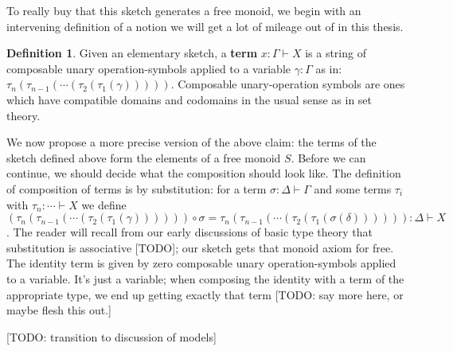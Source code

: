 \documentclass[12pt,twoside]{reedthesis}
\theoremstyle{definition}
\newtheorem{definition}{Definition}
\theoremstyle{remark}
\theoremstyle{plain}
\begin{document}
To really buy that this sketch generates a free monoid, we begin with an
intervening definition of a notion we will get a lot of mileage out of in this
thesis.
\begin{definition}\label{def:term}
  Given an elementary sketch, a \textbf{term} $x : \Gamma \vdash X$ is a string of
  composable unary operation-symbols applied to a variable $\gamma : \Gamma$ as in:
  \( \tau_{n} (\tau_{n-1} (\cdots (\tau_{2}(\tau_{1}(\gamma))))) \). Composable unary-operation
  symbols are ones which have compatible domains and codomains in the usual
  sense as in set theory.
\end{definition}
We now propose a more precise version of the above claim: the terms of the
sketch defined above form the elements of a free monoid \( S \). Before we can
continue, we should decide what the composition should look like. The definition
of composition of terms is by substitution: for a term \( \sigma : \Delta \vdash \Gamma\) and some
terms \( \tau_{i}\) with \( \tau_{n} : \cdots \vdash X \) we define
\[ (\tau_{n} (\tau_{n-1} (\cdots (\tau_{2}(\tau_{1}(\gamma)))))) \circ \sigma = \tau_{n} (\tau_{n-1} (\cdots (\tau_{2}(\tau_{1}(\sigma(\delta)))))) : \Delta \vdash X \].
The reader will recall from our early discussions of basic type theory that
substitution is associative [TODO]; our sketch gets that monoid axiom for free. The
identity term is given by zero composable unary operation-symbols applied to a
variable. It's just a variable; when composing the identity with a term of the
appropriate type, we end up getting exactly that term [TODO: say more here, or maybe
flesh this out.]

  [TODO: transition to discussion of models]

\end{document}
